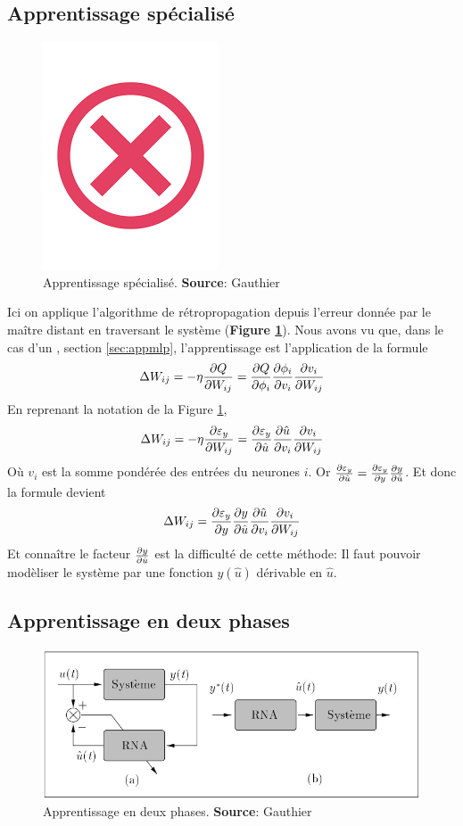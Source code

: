 \subsection{Apprentissage spécialisé}\label{sec:appspecial}
\begin{figure}
 \centering
 \includegraphics[scale=0.5]{../figures/invalid.png}
 \caption{Apprentissage spécialisé. \textbf{Source}: Gauthier\cite{Gauthier}}
 \label{appspecialise}
\end{figure}
Ici on applique l'algorithme de rétropropagation depuis l'erreur donnée par le maître distant en traversant le système (\textbf{Figure \ref{appspecialise}}).
Nous avons vu que, dans le cas d'un \mlp, section \ref{sec:appmlp}, l'apprentissage est l'application de la formule \[\Delta W_{ij} = -\eta\frac{\partial Q}{\partial W_{ij}} = \frac{\partial Q}{\partial \phi_i} \frac{\partial \phi_i}{\partial v_i} \frac{\partial v_i}{\partial W_{ij}}\]
En reprenant la notation de la Figure \ref{appspecialise}, \[\Delta W_{ij} = -\eta\frac{\partial \varepsilon_y}{\partial W_{ij}} = \frac{\partial \varepsilon_y}{\partial \hat{u}} \frac{\partial \hat{u}}{\partial v_i} \frac{\partial v_i}{\partial W_{ij}}\]
Où $v_i$ est la somme pondérée des entrées du neurones $i$.
Or $\frac{\partial \varepsilon_y}{\partial \hat{u}} = \frac{\partial \varepsilon_y}{\partial y}\frac{\partial y}{\partial \hat{u}}$. Et donc la formule devient
\[\Delta W_{ij} = \frac{\partial \varepsilon_y}{\partial y} \frac{\partial y}{\partial \hat{u}} \frac{\partial \hat{u}}{\partial v_i} \frac{\partial v_i}{\partial W_{ij}}\]
Et connaître le facteur $\frac{\partial y}{\partial \hat{u}}$ est la difficulté de cette méthode:
Il faut pouvoir modèliser le système par une fonction $y(\hat{u})$ dérivable en $\hat{u}$.

\subsection{Apprentissage en deux phases}\label{sec:app2phases}
\begin{figure}
 \centering
 \includegraphics[scale=0.5]{../figures/app2phases.jpg}
 \caption{Apprentissage en deux phases. \textbf{Source}: Gauthier\cite{Gauthier}}
 \label{app2phases}
\end{figure}

